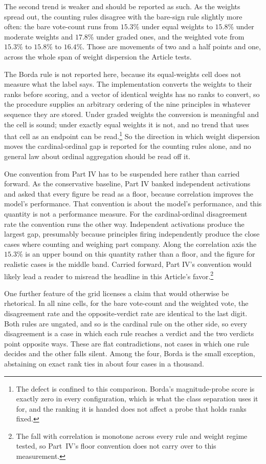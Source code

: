 The second trend is weaker and should be reported as such. As the weights
spread out, the counting rules disagree with the bare-sign rule slightly more
often: the bare vote-count runs from $15.3\%$ under equal weights to $15.8\%$
under moderate weights and $17.8\%$ under graded ones, and the weighted vote
from $15.3\%$ to $15.8\%$ to $16.4\%$. Those are movements of two and a half
points and one, across the whole span of weight dispersion the Article tests.

The Borda rule is not reported here, because its equal-weights cell does not
measure what the label says. The implementation converts the weights to their
ranks before scoring, and a vector of identical weights has no ranks to
convert, so the procedure supplies an arbitrary ordering of the nine
principles in whatever sequence they are stored. Under graded weights the
conversion is meaningful and the cell is sound; under exactly equal weights it
is not, and no trend that uses that cell as an endpoint can be
read.\footnote{The defect is confined to this comparison. Borda's
magnitude-probe score is exactly zero in every configuration, which is what
the class separation uses it for, and the ranking it is handed does not affect
a probe that holds ranks fixed.} So the direction in which weight dispersion
moves the cardinal-ordinal gap is reported for the counting rules alone, and
no general law about ordinal aggregation should be read off it.

One convention from Part IV has to be suspended here rather than carried
forward. As the conservative baseline, Part IV banked independent
activations and asked that every figure be read as a floor, because
correlation improves the model's performance. That convention is about the
model's performance, and this quantity is not a performance measure.
For the cardinal-ordinal disagreement rate the convention runs the other
way. Independent activations produce the largest gap, presumably because
principles firing independently produce the close cases where
counting and weighing part company. Along the correlation axis the $15.3\%$ is an upper bound
on this quantity rather than a floor, and the figure for realistic cases
is the middle band.
Carried forward, Part IV's convention would likely lead a reader to misread
the headline in this Article's favor.\footnote{The fall with correlation is monotone
across every rule and weight regime tested, so Part~IV's floor convention
does not carry over to this measurement.}

One further feature of the grid licenses a claim that would otherwise be
rhetorical. In all nine cells, for the bare vote-count and the weighted
vote, the disagreement rate and the opposite-verdict rate are identical to
the last digit. Both rules are ungated, and so is the cardinal
rule on the other side, so every disagreement is a case in which each
rule reaches a verdict and the two verdicts point opposite ways. These are flat contradictions, not cases in which one rule decides and the
other falls silent. Among the four, Borda is the small exception,
abstaining on exact rank ties in about four cases in a thousand.

